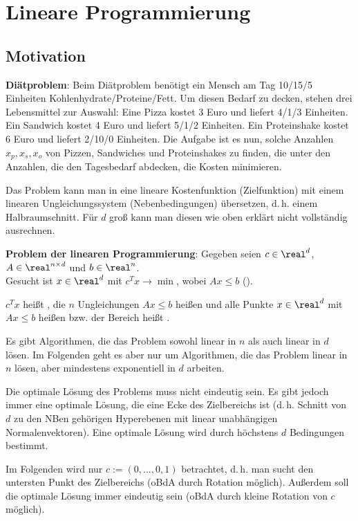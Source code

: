 \section{%
    Lineare Programmierung%
}

\subsection{%
    Motivation%
}

\textbf{Diätproblem}:
Beim Diätproblem benötigt ein Mensch am Tag 10/15/5 Einheiten Kohlenhydrate/Proteine/Fett.
Um diesen Bedarf zu decken, stehen drei Lebensmittel zur Auswahl:
Eine Pizza kostet 3 Euro und liefert 4/1/3 Einheiten.
Ein Sandwich kostet 4 Euro und liefert 5/1/2 Einheiten.
Ein Proteinshake kostet 6 Euro und liefert 2/10/0 Einheiten.
Die Aufgabe ist es nun, solche Anzahlen $x_p, x_s, x_o$ von Pizzen, Sandwiches und Proteinshakes
zu finden, die unter den Anzahlen, die den Tagesbedarf abdecken, die Kosten minimieren.

Das Problem kann man in eine lineare Kostenfunktion (Zielfunktion) mit einem linearen
Ungleichungssystem (Nebenbedingungen) übersetzen,
d.\,h. einem Halbraumschnitt.
Für $d$ groß kann man diesen wie oben erklärt nicht vollständig ausrechnen.

\linie

\textbf{Problem der linearen Programmierung}:
Gegeben seien $c \in \real^d$, $A \in \real^{n \times d}$ und $b \in \real^n$.\\
Gesucht ist $x \in \real^d$ mit $c^T x \to \min$, wobei $Ax \le b$
().

$c^T x$ heißt , die $n$ Ungleichungen $Ax \le b$ heißen
und alle Punkte $x \in \real^d$ mit $Ax \le b$ heißen  bzw.
der Bereich heißt .

Es gibt Algorithmen, die das Problem sowohl linear in $n$ als auch linear in $d$ lösen.
Im Folgenden geht es aber nur um Algorithmen, die das Problem linear in $n$ lösen,
aber mindestens exponentiell in $d$ arbeiten.

Die optimale Lösung des Problems muss nicht eindeutig sein.
Es gibt jedoch immer eine optimale Lösung, die eine Ecke des Zielbereichs ist
(d.\,h. Schnitt von $d$ zu den NBen gehörigen Hyperebenen
mit linear unabhängigen Normalenvektoren).
Eine optimale Lösung wird durch höchstens $d$ Bedingungen bestimmt.

Im Folgenden wird nur $c := (0, \dotsc, 0, 1)$ betrachtet,
d.\,h. man sucht den untersten Punkt des Zielbereichs (oBdA durch Rotation möglich).
Außerdem soll die optimale Lösung immer eindeutig sein
(oBdA durch kleine Rotation von $c$ möglich).

